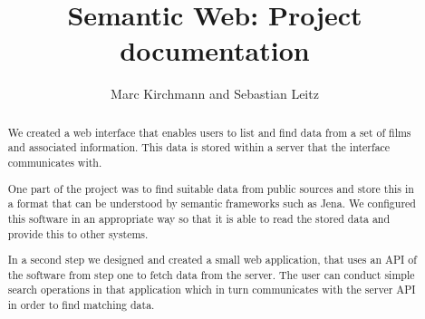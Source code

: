 \documentclass{llncs}
\begin{document}
\title{Semantic Web: Project documentation}

\author{
Marc Kirchmann and Sebastian Leitz}

\maketitle

\begin{abstract}
We created a web interface that enables users to list and find data from a set of films and associated information. This data is stored within a server that the interface communicates with.

One part of the project was to find suitable data from public sources and store this in a format that can be understood by semantic frameworks such as Jena. We configured this software in an appropriate way so that it is able to read the stored data and provide this to other systems.

In a second step we designed and created a small web application, that uses an API of the software from step one to fetch data from the server. The user can conduct simple search operations in that application which in turn communicates with the server API in order to find matching data.
\end{abstract}









\end{document}
